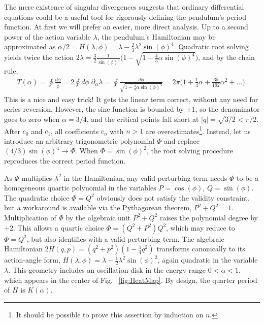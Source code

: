 \documentclass[nofootinbib,preprint]{revtex4-1}
\begin{document}
The mere existence of singular divergences suggests that ordinary differential equations 
could be a useful tool for rigorously defining the pendulum's period function. At first 
we will prefer an easier, more direct analysis. Up to a second power of the action variable 
$\lambda$, the pendulum's Hamiltonian may be approximated as 
$\alpha/2=H(\lambda,\phi)=\lambda - \frac{2}{3}\lambda^2\sin(\phi)^4 $. 
Quadratic root solving yields twice the action $2\lambda=\frac{3}{2}\frac{1}{\sin(\phi)^4}
\Big(1-\sqrt{1-\frac{4}{3}\alpha \sin(\phi)^4}\Big)$, 
and by the chain rule, 
\begin{eqnarray}
T(\alpha) = \oint \frac{d\phi}{\dot{\phi}} =2 \oint d\phi\; \partial_{\alpha}\lambda 
= \oint \frac{d\phi}{\sqrt{1-\frac{4}{3}\alpha \sin(\phi)^4}} = 2\pi\bigg(1 + 
\frac{1}{4}\alpha + \frac{35}{192}\alpha^2 + \ldots \bigg) \nonumber .
\end{eqnarray}
This is a nice and easy trick! It gets the linear term correct, without any need for series reversion. 
However, the sine function is bounded by $\pm 1$, so the denominator goes to zero when $\alpha=3/4$,
and the critical points fall short at $|q|=\sqrt{3/2}<\pi/2$. After $c_0$ and $c_1$, all 
coefficients $c_n$ with $n>1$ are overestimates\footnote{It should be possible to
prove this assertion by induction on $n$.}. Instead, let us introduce an arbitrary 
trigonometric polynomial $\Phi$ and replace $(4/3)\sin(\phi)^4 \rightarrow \Phi $.
When $\Phi=\sin(\phi)^2$, the root solving procedure reproduces the correct period 
function. 

As $\Phi$ multiplies $\lambda^2$ in the Hamiltonian, any valid perturbing term needs $\Phi$ to 
be a homogeneous quartic polynomial in the variables $P=\cos(\phi)$, $Q=\sin(\phi)$. The quadratic 
choice $\Phi=Q^2$ obviously does not satisfy the validity constraint, but a workaround is available 
via the Pythagorean theorem, $P^2+Q^2=1$. Multiplication of $\Phi$ by the algebraic unit $P^2+Q^2$ 
raises the polynomial degree by $+2$. This allows a quartic choice $\Phi=(Q^2+P^2)Q^2$, 
which may reduce to $\Phi=Q^2$, but also identifies with a valid perturbing term. The algebraic Hamiltonian 
$2H(q,p)=(q^2+p^2)(1-\frac{1}{4}q^2)$ transforms canonically to its action-angle form, 
$H(\lambda,\phi)=\lambda - \frac{1}{2}\lambda^2\sin(\phi)^2 $, again quadratic in the variable $\lambda$.
This geometry includes an oscillation disk in the energy range $0<\alpha<1$, which appears in 
the center of Fig. ~\ref{fig:HeatMap}. By design, the quarter period of $H$ is $K(\alpha)$.
\end{document}
